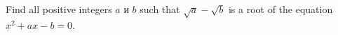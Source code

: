 \problem
Find all positive integers $a$ и $b$ such that $\sqrt{a} - \sqrt{b}$ is a root
of the equation $x^2 + a x - b = 0$.

\solution

\endproblem
